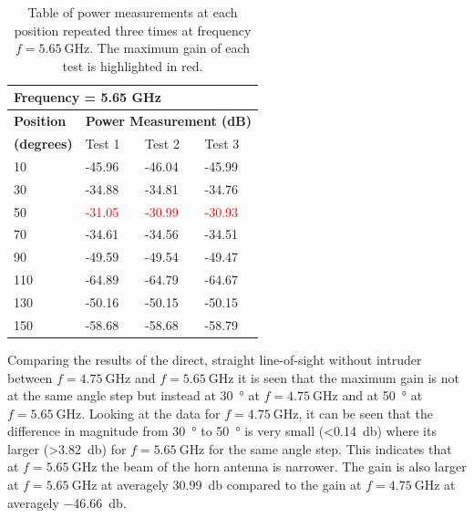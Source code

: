 \begin{table}[H]
    \centering
    \begin{tabular}{l|l|l|l}
        \multicolumn{4}{l}{\textbf{Frequency = 5.65 GHz}}         \\
        \hline
        \textbf{Position} & \multicolumn{3}{l}{\textbf{Power Measurement (dB)}} \\
        \textbf{(degrees)}  & Test 1    & Test 2  & Test 3  \\
        \hline
        \hline
        10      & -45.96    & -46.04    & -45.99 \\
        30      & -34.88    & -34.81    & -34.76 \\
        50      & \textcolor{red}{-31.05}    & \textcolor{red}{-30.99}    & \textcolor{red}{-30.93} \\
        70      & -34.61    & -34.56    & -34.51 \\
        90      & -49.59    & -49.54    & -49.47 \\
        110     & -64.89    & -64.79    & -64.67 \\
        130     & -50.16    & -50.15    & -50.15 \\
        150     & -58.68    & -58.68    & -58.79
        \end{tabular}
    \caption{Table of power measurements at each position repeated three times at frequency $f=\SI{5.65}{\giga\hertz}$. The maximum gain of each test is highlighted in red.}
    \label{tab:a2_1b}
\end{table}

Comparing the results of the direct, straight line-of-sight without intruder between $f=\SI{4.75}{\giga\hertz}$ and $f=\SI{5.65}{\giga\hertz}$ it is seen that the maximum gain is not at the same angle step but instead at \SI{30}{\degree} at $f=\SI{4.75}{\giga\hertz}$ and at \SI{50}{\degree} at $f=\SI{5.65}{\giga\hertz}$. Looking at the data for $f=\SI{4.75}{\giga\hertz}$, it can be seen that the difference in magnitude from \SI{30}{\degree} to \SI{50}{\degree} is very small (<\SI{0.14}{\decibel}) where its larger (>\SI{3.82}{\decibel}) for $f=\SI{5.65}{\giga\hertz}$ for the same angle step. This indicates that at $f=\SI{5.65}{\giga\hertz}$ the beam of the horn antenna is narrower. The gain is also larger at $f=\SI{5.65}{\giga\hertz}$ at averagely \SI{30.99}{\decibel} compared to the gain at $f=\SI{4.75}{\giga\hertz}$ at averagely \SI{-46.66}{\decibel}.

